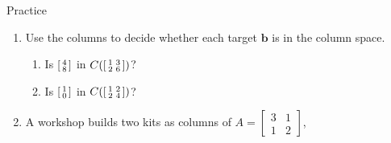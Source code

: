 \documentclass[10pt]{article}
\newcommand{\bb}{\mathbf{b}}
\begin{document}
\begin{notesbox}{Practice}
\begin{enumerate}[leftmargin=1.9em, itemsep=10pt]
{    \ (c) Line --- $\begin{bsmallmatrix} 3\\6 \end{bsmallmatrix}=3\begin{bsmallmatrix} 1\\2 \end{bsmallmatrix}$ (parallel).}
  \item Use the columns to decide whether each target $\bb$ is in the column space.
    \begin{enumerate}[label=(\alph*), leftmargin=1.8em, itemsep=4pt]
      \item Is $\begin{bsmallmatrix} 4 \\ 8 \end{bsmallmatrix}$ in $C\!\left(\begin{bsmallmatrix} 1 & 3 \\ 2 & 6 \end{bsmallmatrix}\right)$? \hfill
      \item Is $\begin{bsmallmatrix} 1 \\ 0 \end{bsmallmatrix}$ in $C\!\left(\begin{bsmallmatrix} 1 & 2 \\ 2 & 4 \end{bsmallmatrix}\right)$?
    \end{enumerate}
  \tcbbreak
  \item A workshop builds two kits as columns of $A=\begin{bmatrix} 3 & 1 \\ 1 & 2 \end{bmatrix}$,

\end{enumerate}
\end{notesbox}
\end{document}
